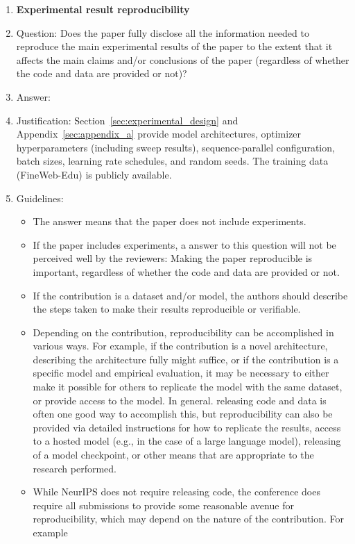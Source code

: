 \documentclass{article}
\begin{document}
\begin{enumerate}
    \item {\bf Experimental result reproducibility}
    \item[] Question: Does the paper fully disclose all the information needed to reproduce the main experimental results of the paper to the extent that it affects the main claims and/or conclusions of the paper (regardless of whether the code and data are provided or not)?
    \item[] Answer: \answerYes{}
    \item[] Justification: Section~\ref{sec:experimental_design} and Appendix~\ref{sec:appendix_a} provide model architectures, optimizer hyperparameters (including sweep results), sequence-parallel configuration, batch sizes, learning rate schedules, and random seeds. The training data (FineWeb-Edu) is publicly available.
    \item[] Guidelines:
    \begin{itemize}
        \item The answer \answerNA{} means that the paper does not include experiments.
        \item If the paper includes experiments, a \answerNo{} answer to this question will not be perceived well by the reviewers: Making the paper reproducible is important, regardless of whether the code and data are provided or not.
        \item If the contribution is a dataset and\slash or model, the authors should describe the steps taken to make their results reproducible or verifiable. 
        \item Depending on the contribution, reproducibility can be accomplished in various ways. For example, if the contribution is a novel architecture, describing the architecture fully might suffice, or if the contribution is a specific model and empirical evaluation, it may be necessary to either make it possible for others to replicate the model with the same dataset, or provide access to the model. In general. releasing code and data is often one good way to accomplish this, but reproducibility can also be provided via detailed instructions for how to replicate the results, access to a hosted model (e.g., in the case of a large language model), releasing of a model checkpoint, or other means that are appropriate to the research performed.
        \item While NeurIPS does not require releasing code, the conference does require all submissions to provide some reasonable avenue for reproducibility, which may depend on the nature of the contribution. For example

\end{itemize}
\end{enumerate}
\end{document}
